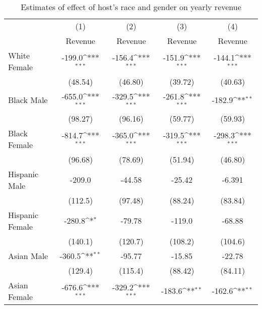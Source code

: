 {
\def\sym#1{\ifmmode^{#1}\else\(^{#1}\)\fi}
\begin{longtable}{l*{4}{c}}
\caption{Estimates of effect of host's race and gender on yearly revenue} \label{table:revenue}\\
\hline\hline\endfirsthead\hline\endhead\hline\endfoot\endlastfoot
                    &\multicolumn{1}{c}{(1)}&\multicolumn{1}{c}{(2)}&\multicolumn{1}{c}{(3)}&\multicolumn{1}{c}{(4)}\\
                    &\multicolumn{1}{c}{Revenue}&\multicolumn{1}{c}{Revenue}&\multicolumn{1}{c}{Revenue}&\multicolumn{1}{c}{Revenue}\\
\hline
White Female        &      -199.0\sym{***}&      -156.4\sym{***}&      -151.9\sym{***}&      -144.1\sym{***}\\
                    &     (48.54)         &     (46.80)         &     (39.72)         &     (40.63)         \\
[1em]
Black Male          &      -655.0\sym{***}&      -329.5\sym{***}&      -261.8\sym{***}&      -182.9\sym{**} \\
                    &     (98.27)         &     (96.16)         &     (59.77)         &     (59.93)         \\
[1em]
Black Female        &      -814.7\sym{***}&      -365.0\sym{***}&      -319.5\sym{***}&      -298.3\sym{***}\\
                    &     (96.68)         &     (78.69)         &     (51.94)         &     (46.80)         \\
[1em]
Hispanic Male       &      -209.0         &      -44.58         &      -25.42         &      -6.391         \\
                    &     (112.5)         &     (97.48)         &     (88.24)         &     (83.84)         \\
[1em]
Hispanic Female     &      -280.8\sym{*}  &      -79.78         &      -119.0         &      -68.88         \\
                    &     (140.1)         &     (120.7)         &     (108.2)         &     (104.6)         \\
[1em]
Asian Male          &      -360.5\sym{**} &      -95.77         &      -15.85         &      -22.78         \\
                    &     (129.4)         &     (115.4)         &     (88.42)         &     (84.11)         \\
[1em]
Asian Female        &      -676.6\sym{***}&      -329.2\sym{***}&      -183.6\sym{**} &      -162.6\sym{**} \\

\end{longtable}}
